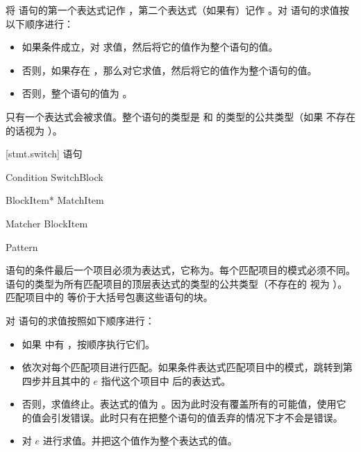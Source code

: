 \pnum
将  语句的第一个表达式记作 ，第二个表达式（如果有）记作 。对  语句的求值按以下顺序进行：

\begin{itemize}

\item 如果条件成立，对  求值，然后将它的值作为整个语句的值。
\item 否则，如果存在 ，那么对它求值，然后将它的值作为整个语句的值。
\item 否则，整个语句的值为 。

\end{itemize}

只有一个表达式会被求值。整个语句的类型是  和  的类型的公共类型（如果  不存在的话视为 ）。

[stmt.switch]{ 语句}
\indextext{}

\begin{bnf}
 \br
     Condition SwitchBlock
\end{bnf}

\begin{bnf}
 \br
    \terminal{\{} BlockItem* MatchItem\bnfs \terminal{\}}
\end{bnf}

\begin{bnf}
 \br
    Matcher BlockItem\bnfp
\end{bnf}

\begin{bnf}
 \br
    Pattern\bnfl\terminal{,} \terminal{=>}
\end{bnf}

\pnum
{} 语句的条件最后一个项目必须为表达式，它称为。每个匹配项目的模式必须不同。 语句的类型为所有匹配项目的顶层表达式的类型的公共类型（不存在的  视为 ）。匹配项目中的  等价于大括号包裹这些语句的块。

\pnum
对  语句的求值按照如下顺序进行：

\begin{itemize}
\item 如果  中有 ，按顺序执行它们。
\item 依次对每个匹配项目进行匹配。如果条件表达式匹配项目中的模式，跳转到第四步并且其中的 $e$ 指代这个项目中 \tcode{=>} 后的表达式。
\item 否则，求值终止。表达式的值为 。\enternote 因为此时没有覆盖所有的可能值，使用它的值会引发错误。此时只有在把整个语句的值丢弃的情况下才不会是错误。\exitnote
\item 对 $e$ 进行求值。并把这个值作为整个表达式的值。
\end{itemize}

